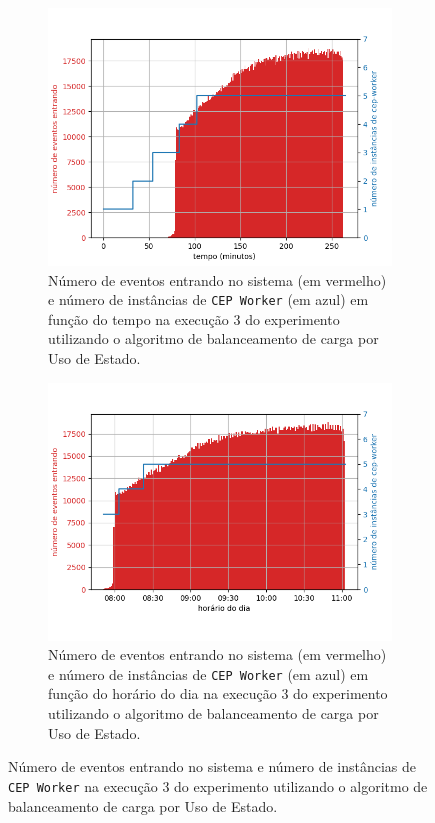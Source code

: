 \begin{figure}[h]
\centering
\begin{subfigure}{0.9\textwidth}
\centering
\includegraphics[width=\textwidth]{figuras/graphics/carga_e_workers_total8-dez-su.png}
\caption{Número de eventos entrando no sistema (em vermelho) e número de instâncias de \texttt{CEP Worker} (em azul) em função do tempo na execução 3 do experimento utilizando o algoritmo de balanceamento de carga por Uso de Estado.}
\label{fig:workers_and_load_total_8-dez-su}
\end{subfigure}%

\begin{subfigure}{\textwidth}
\centering
\includegraphics[width=\textwidth]{figuras/graphics/carga_e_workers_horario8-dez-su.png}
\caption{Número de eventos entrando no sistema (em vermelho) e número de instâncias de \texttt{CEP Worker} (em azul) em função do horário do dia na execução 3 do experimento utilizando o algoritmo de balanceamento de carga por Uso de Estado.}
\label{fig:workers_and_load_SPtrans_8-dez-su}
\end{subfigure}%
\caption{Número de eventos entrando no sistema e número de instâncias de \texttt{CEP Worker} na execução 3 do experimento utilizando o algoritmo de balanceamento de carga por Uso de Estado.}
\end{figure}


